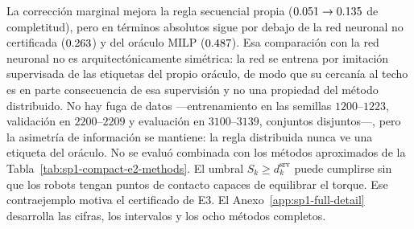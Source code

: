 La corrección marginal mejora la regla secuencial propia
($0.051\to0.135$ de completitud), pero en
términos absolutos sigue por debajo de la red neuronal no certificada
($0.263$) y del oráculo MILP ($0.487$). Esa
comparación con la red neuronal no es arquitectónicamente simétrica: la red se
entrena por imitación supervisada de las etiquetas del propio oráculo, de modo
que su cercanía al techo es en parte consecuencia de esa supervisión y no una
propiedad del método distribuido. No hay fuga de datos ---entrenamiento en las
semillas $1200$--$1223$, validación en $2200$--$2209$ y evaluación en
$3100$--$3139$, conjuntos disjuntos---, pero la asimetría de información se
mantiene: la regla distribuida nunca ve una etiqueta del oráculo. No se evaluó
combinada con los métodos aproximados de la
Tabla~\ref{tab:sp1-compact-e2-methods}.
El umbral $S_k\geq d_k^{\mathrm{srv}}$ puede cumplirse sin que los robots
tengan puntos de contacto capaces de equilibrar el torque. Ese contraejemplo
motiva el certificado de E3. El Anexo~\ref{app:sp1-full-detail} desarrolla las
cifras, los intervalos y los ocho métodos completos.


